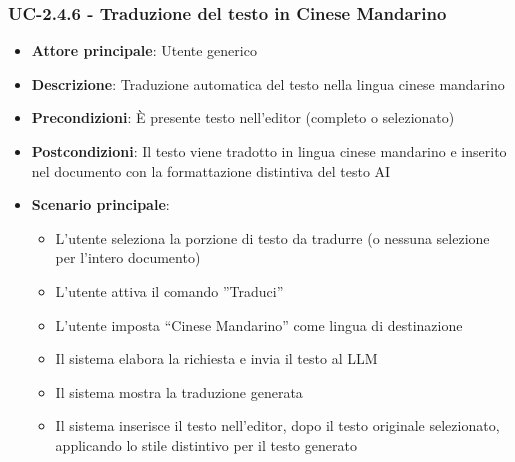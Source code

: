 \documentclass[11pt,a4paper]{article}
\begin{document}
\subsubsection{UC-2.4.6 - Traduzione del testo in Cinese Mandarino}
\begin{itemize}
    \item \textbf{Attore principale}: Utente generico
    \item \textbf{Descrizione}: Traduzione automatica del testo nella lingua cinese mandarino
    \item \textbf{Precondizioni}: È presente testo nell’editor (completo o selezionato)
    \item \textbf{Postcondizioni}: Il testo viene tradotto in lingua cinese mandarino e inserito nel documento con la formattazione distintiva del testo AI
    \item \textbf{Scenario principale}:
    \begin{itemize}
        \item L’utente seleziona la porzione di testo da tradurre (o nessuna selezione per l'intero documento)
        \item L’utente attiva il comando ”Traduci”
        \item L’utente imposta “Cinese Mandarino” come lingua di destinazione
        \item Il sistema elabora la richiesta e invia il testo al LLM
        \item Il sistema mostra la traduzione generata
        \item Il sistema inserisce il testo nell'editor, dopo il testo originale selezionato, applicando lo stile distintivo per il testo generato
    \end{itemize}
\end{itemize}
\end{document}
